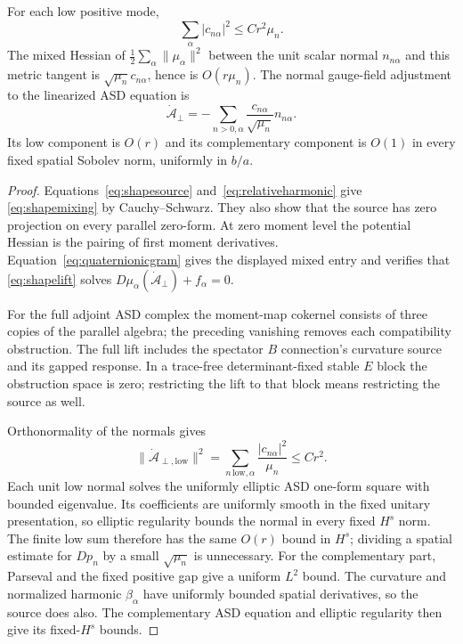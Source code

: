 \begin{lemma}\label{lem:shapemixing}
For each low positive mode,
\begin{equation}\label{eq:shapemixing}
 \sum_\alpha|c_{n\alpha}|^2\le Cr^2\mu_n.
\end{equation}
The mixed Hessian of $\tfrac12\sum_\alpha\|\mu_\alpha\|^2$
between the unit scalar normal $n_{n\alpha}$ and this metric tangent
is $\sqrt{\mu_n}c_{n\alpha}$, hence is $O(r\mu_n)$.
The normal gauge-field adjustment to the linearized ASD equation is
\begin{equation}\label{eq:shapelift}
 \dot{\mathcal A}_\perp
 =-\sum_{n>0,\alpha}\frac{c_{n\alpha}}{\sqrt{\mu_n}}n_{n\alpha}.
\end{equation}
Its low component is $O(r)$ and its complementary component is $O(1)$
in every fixed spatial Sobolev norm, uniformly in $b/a$.
\end{lemma}
\begin{proof}
Equations~\eqref{eq:shapesource} and~\eqref{eq:relativeharmonic}
give \eqref{eq:shapemixing} by Cauchy--Schwarz. They also show that
the source has zero projection on every parallel zero-form.
At zero moment level the potential Hessian is the pairing of first
moment derivatives. Equation~\eqref{eq:quaternionicgram} gives the
displayed mixed entry and verifies that \eqref{eq:shapelift} solves
$D\mu_\alpha(\dot{\mathcal A}_\perp)+f_\alpha=0$.

For the full adjoint ASD complex the moment-map cokernel consists of
three copies of the parallel algebra; the preceding vanishing removes
each compatibility obstruction. The full lift includes the spectator
$B$ connection's curvature source and its gapped response. In a
trace-free determinant-fixed stable $E$ block the obstruction space
is zero; restricting the lift to that block means restricting the
source as well.

Orthonormality of the normals gives
\[
 \|\dot{\mathcal A}_{\perp,\mathrm{low}}\|^2
 =\sum_{n\,\mathrm{low},\alpha}\frac{|c_{n\alpha}|^2}{\mu_n}
 \le Cr^2.
\]
Each unit low normal solves the uniformly elliptic ASD one-form
square with bounded eigenvalue. Its coefficients are uniformly
smooth in the fixed unitary presentation, so elliptic regularity
bounds the normal in every fixed $H^s$ norm. The finite low sum
therefore has the same $O(r)$ bound in $H^s$; dividing a spatial
estimate for $Dp_n$ by a small $\sqrt{\mu_n}$ is unnecessary.
For the complementary part, Parseval and the fixed positive gap
give a uniform $L^2$ bound. The curvature and normalized harmonic
$\beta_\alpha$ have uniformly bounded spatial derivatives, so the
source does also. The complementary ASD equation and elliptic
regularity then give its fixed-$H^s$ bounds.
\end{proof}

